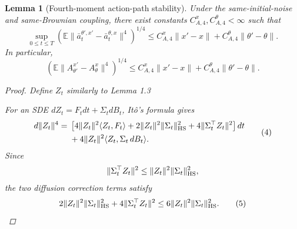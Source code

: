 \documentclass{article}
\newtheorem{lem}[thm]{Lemma}
\theoremstyle{definition}
\theoremstyle{remark}
\theoremstyle{mystyle}
\newcommand{\1}{\mathbbm{1}}
\begin{document}
\begin{lem}[Fourth-moment action-path stability]
Under the same-initial-noise and same-Brownian coupling, there exist
constants \(C_{A,4}^x,C_{A,4}^\theta<\infty\) such that
\[
\sup_{0\le t\le T}
\left(
\mathbb E
\|\bar a_t^{\theta',x'}-\bar a_t^{\theta,x}\|^4
\right)^{1/4}
\le
C_{A,4}^x\|x'-x\|
+
C_{A,4}^\theta\|\theta'-\theta\|.
\tag{A4}
\]
In particular,
\[
\left(
\mathbb E
\|A_{\theta'}^{x'}-A_\theta^x\|^4
\right)^{1/4}
\le
C_{A,4}^x\|x'-x\|
+
C_{A,4}^\theta\|\theta'-\theta\|.
\tag{A4'}
\]

\begin{proof}
Define $Z_t$ similarly to Lemma 1.3


For an SDE \(dZ_t=F_tdt+\Sigma_t dB_t\), It\^o's formula gives
\[
\begin{aligned}
d\|Z_t\|^4
={}&
\left[
4\|Z_t\|^2\langle Z_t,F_t\rangle
+
2\|Z_t\|^2\|\Sigma_t\|_{\rm HS}^2
+
4\|\Sigma_t^\top Z_t\|^2
\right]dt\\
&+
4\|Z_t\|^2
\langle Z_t,\Sigma_t\,dB_t\rangle.
\end{aligned}
\tag{4}
\]
Since
\[
\|\Sigma_t^\top Z_t\|^2
\le
\|Z_t\|^2\|\Sigma_t\|_{\rm HS}^2,
\]
the two diffusion correction terms satisfy
\[
2\|Z_t\|^2\|\Sigma_t\|_{\rm HS}^2
+
4\|\Sigma_t^\top Z_t\|^2
\le
6\|Z_t\|^2\|\Sigma_t\|_{\rm HS}^2.
\tag{5}
\]


\end{proof}
\end{lem}
\end{document}
